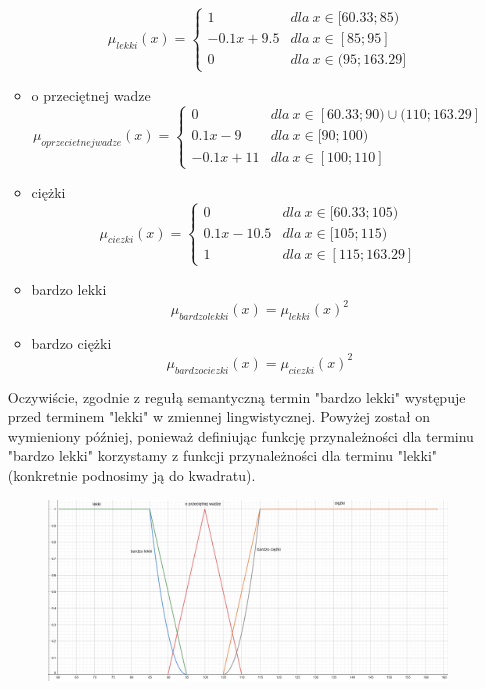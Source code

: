 \documentclass{classrep}
\begin{document}
\begin{enumerate}
\begin{itemize}
        \begin{equation}
            \mu_{lekki}(x) = \left\{\begin{matrix} 1 & dla \: x\in[60.33;85) \\ -0.1x + 9.5 & dla \: x\in [85; 95] \\ 0 & dla \: x\in (95; 163.29] \end{matrix}\right.
        \end{equation}
         \item o przeciętnej wadze
        \begin{equation}
            \mu_{oprzecietnejwadze}(x) = \left\{\begin{matrix} 0 & dla \: x\in [60.33; 90) \cup (110; 163.29] \\ 0.1x - 9 & dla \: x\in[90;100) \\ -0.1x + 11 & dla \: x\in [100; 110] \end{matrix}\right.
        \end{equation}
        \item ciężki
        \begin{equation}
            \mu_{ciezki}(x) = \left\{\begin{matrix} 0 & dla \: x\in [60.33; 105) \\ 0.1x - 10.5 & dla \: x\in[105;115) \\ 1 & dla \: x\in [115; 163.29] \end{matrix}\right.
        \end{equation}
        \item bardzo lekki
        \begin{equation}
            \mu_{bardzolekki}(x) = \mu_{lekki}(x)^2
        \end{equation}
        \item bardzo ciężki
        \begin{equation}
            \mu_{bardzociezki}(x) = \mu_{ciezki}(x)^2
        \end{equation}
    \end{itemize}
    Oczywiście, zgodnie z regułą semantyczną termin "bardzo lekki" występuje przed terminem "lekki" w zmiennej lingwistycznej. Powyżej został on wymieniony później, ponieważ definiując funkcję przynależności dla terminu "bardzo lekki" korzystamy z funkcji przynależności dla terminu "lekki" (konkretnie podnosimy ją do kwadratu).
    \begin{figure}[H]
        \centering
        \includegraphics[width=14cm]{wykres_waga.png}

\end{figure}
\end{enumerate}
\end{document}
